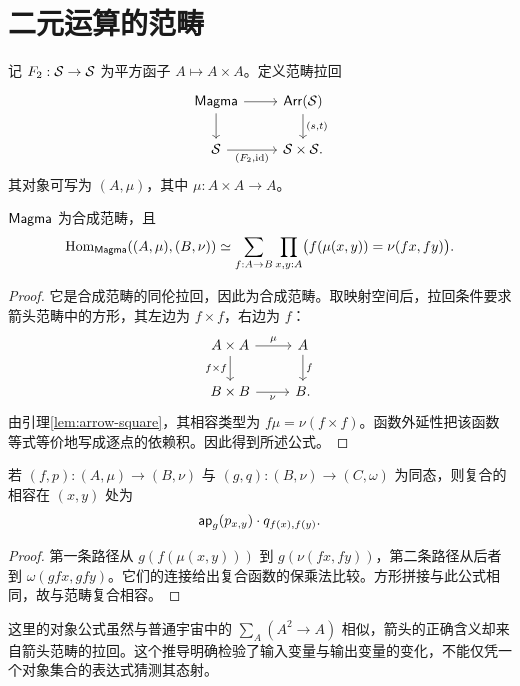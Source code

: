 \section{二元运算的范畴}
\begin{definition}[乘法空间范畴]
记 $F_2:\mathcal S\to\mathcal S$ 为平方函子 $A\mapsto A\times A$。定义范畴拉回
\[
\begin{tikzcd}
\Magma\ar[r]\ar[d]&\mathsf{Arr}(\Sp)\ar[d,"{(s,t)}"]\\
\Sp\ar[r,"{(F_2,\id)}"']&\Sp\times\Sp.
\end{tikzcd}
\]
其对象可写为 $(A,\mu)$，其中 $\mu:A\times A\to A$。
\end{definition}
\begin{theorem}[二元运算同态]\label{thm:magma-hom}
$\mathsf{Magma}$ 为合成范畴，且
\[
\operatorname{Hom}_{\mathsf{Magma}}((A,\mu),(B,\nu))
\simeq
\sum_{f:A\to B}\prod_{x,y:A}
\bigl(f(\mu(x,y))=\nu(fx,fy)\bigr).
\]
\end{theorem}
\begin{proof}
它是合成范畴的同伦拉回，因此为合成范畴。取映射空间后，拉回条件要求箭头范畴中的方形，其左边为 $f\times f$，右边为 $f$：
\[
\begin{tikzcd}
A\times A\ar[r,"\mu"]\ar[d,"f\times f"']&A\ar[d,"f"]\\
B\times B\ar[r,"\nu"']&B.
\end{tikzcd}
\]
由引理\ref{lem:arrow-square}，其相容类型为 $f\mu=\nu(f\times f)$。函数外延性把该函数等式等价地写成逐点的依赖积。因此得到所述公式。
\end{proof}
\begin{proposition}[同态的复合相容]
若 $(f,p):(A,\mu)\to(B,\nu)$ 与 $(g,q):(B,\nu)\to(C,\omega)$ 为同态，则复合的相容在 $(x,y)$ 处为
\[
\mathsf{ap}_g(p_{x,y})\cdot q_{f(x),f(y)}.
\]
\end{proposition}
\begin{proof}
第一条路径从 $g(f(\mu(x,y)))$ 到 $g(\nu(fx,fy))$，第二条路径从后者到 $\omega(gfx,gfy)$。它们的连接给出复合函数的保乘法比较。方形拼接与此公式相同，故与范畴复合相容。
\end{proof}
\begin{remark}
这里的对象公式虽然与普通宇宙中的 $\sum_A(A^2\to A)$ 相似，箭头的正确含义却来自箭头范畴的拉回。这个推导明确检验了输入变量与输出变量的变化，不能仅凭一个对象集合的表达式猜测其态射。
\end{remark}

